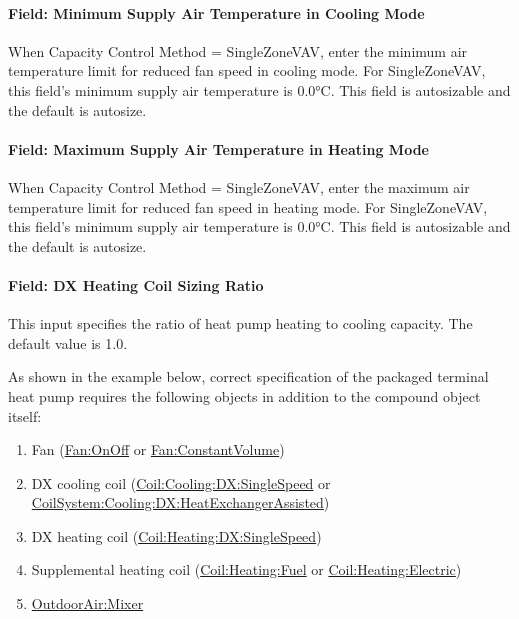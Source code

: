 \paragraph{Field: Minimum Supply Air Temperature in Cooling Mode}\label{field-minimum-supply-air-temperature-in-cooling-mode-3}

When Capacity Control Method = SingleZoneVAV, enter the minimum air temperature limit for reduced fan speed in cooling mode. For SingleZoneVAV, this field's minimum supply air temperature is 0.0\si{\degreeCelsius}. This field is autosizable and the default is autosize.

\paragraph{Field: Maximum Supply Air Temperature in Heating Mode}\label{field-maximum-supply-air-temperature-in-heating-mode-3}

When Capacity Control Method = SingleZoneVAV, enter the maximum air temperature limit for reduced fan speed in heating mode. For SingleZoneVAV, this field's minimum supply air temperature is 0.0\si{\degreeCelsius}. This field is autosizable and the default is autosize.

\paragraph{Field: DX Heating Coil Sizing Ratio}\label{field-dx-heating-coil-sizing-ratio-0101}

This input specifies the ratio of heat pump heating to cooling capacity. The default value is 1.0.

As shown in the example below, correct specification of the packaged terminal heat pump requires the following objects in addition to the compound object itself:

\begin{enumerate}
\def\labelenumi{\arabic{enumi})}
\item
  Fan (\hyperref[fanonoff]{Fan:OnOff} or \hyperref[fanconstantvolume]{Fan:ConstantVolume})
\item
  DX cooling coil (\hyperref[coilcoolingdxsinglespeed]{Coil:Cooling:DX:SingleSpeed} or \hyperref[coilsystemcoolingdxheatexchangerassisted]{CoilSystem:Cooling:DX:HeatExchangerAssisted})
\item
  DX heating coil (\hyperref[coilheatingdxsinglespeed]{Coil:Heating:DX:SingleSpeed})
\item
  Supplemental heating coil (\hyperref[coilheatinggas-000]{Coil:Heating:Fuel} or \hyperref[coilheatingelectric]{Coil:Heating:Electric})
\item
  \hyperref[outdoorairmixer]{OutdoorAir:Mixer}
\end{enumerate}

